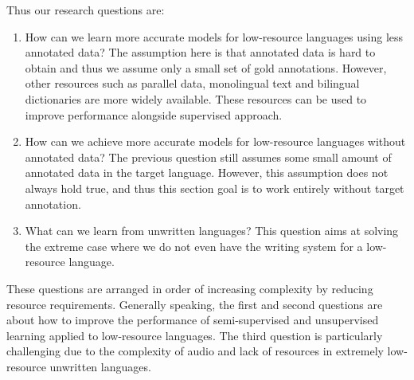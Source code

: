 \documentclass[12pt,twoside,final,hidelinks]{ltthesis}
\theoremstyle{definition}
\begin{document}
\noindent Thus our research questions are: 
\begin{enumerate}
\item How can we learn more accurate models for low-resource languages using less annotated data? The assumption here is that annotated data is hard to obtain and thus we assume only a small set of gold annotations. However, other resources such as parallel data, monolingual text and bilingual dictionaries are more widely available. These resources can be used to improve performance alongside supervised approach.
\item How can we achieve more accurate models for low-resource languages without annotated data? The previous question still assumes some small amount of annotated data in the target language. However, this assumption does not always hold true, and thus this section goal is to work entirely without target annotation.
\item What can we learn from unwritten languages? This question aims at solving the extreme case where we do not even have the writing system for a low-resource language.  
\end{enumerate}
These questions are arranged in order of increasing complexity by reducing resource requirements. Generally speaking, the first and second questions are about how to improve
the performance of semi-supervised and unsupervised learning applied to low-resource languages. The third question is particularly challenging due to the complexity of audio and lack of resources in extremely low-resource unwritten languages. 
\end{document}
